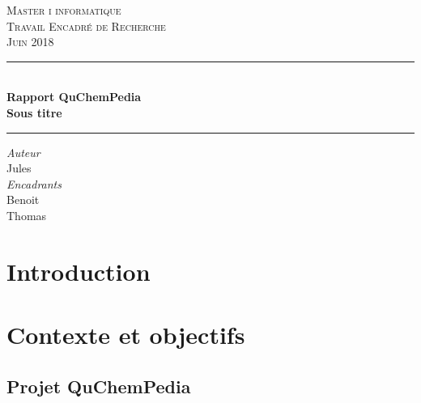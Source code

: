 \documentclass{report}
\begin{document}
\begin{titlepage}
	\centering
	
    \vspace*{1.2 cm}
    
   	\textsc{\LARGE Master i informatique\\Travail Encadré de Recherche\\[0.3cm]\large Juin 2018}

	\vspace{2.2cm}
    
    
	\rule{\linewidth }{0.2 mm} \\[0.15 cm]
    {\LARGE \textbf{Rapport QuChemPedia}\\[0.2cm] \large
		\textbf{Sous titre}}\\
	\rule{\linewidth}{0.2 mm}
       \vspace*{0.1 cm}
	
	\begin{center}
	\vspace{0.3cm}
	
	\emph{Auteur}\\
	\vspace{0.1cm}
	Jules \\ 
	
	
	\vspace{0.5cm}
	\emph{Encadrants}\\
	\vspace{0.1cm}
	Benoit \\
	Thomas 
	\end{center}		
	
	\vspace{1.0cm}


    
    
\end{titlepage}


\tableofcontents

\chapter{Introduction}
	

\chapter{Contexte et objectifs}
	\section{Projet QuChemPedia}
		
\end{document}
